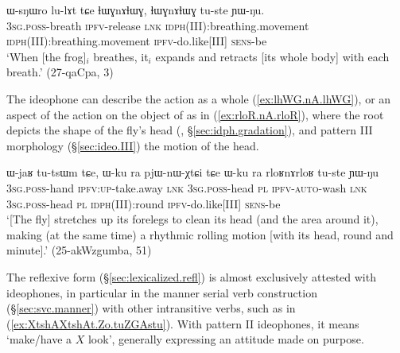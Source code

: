 \begin{exe}
\ex \label{ex:lhWG.nA.lhWG}
\gll ɯ-sŋɯro lu-lɤt tɕe ɬɯɣnɤɬɯɣ, ɬɯɣnɤɬɯɣ tu-ste ɲɯ-ŋu.\\
\textsc{3sg}.\textsc{poss}-breath \textsc{ipfv}-release \textsc{lnk} \textsc{idph}(III):breathing.movement \textsc{idph}(III):breathing.movement \textsc{ipfv}-do.like[III] \textsc{sens}-be \\
\glt `When [the frog]$_i$ breathes, it$_i$ expands and retracts [its whole body] with each breath.' (27-qaCpa, 3)
\end{exe}

The ideophone can describe the action as a whole (\ref{ex:lhWG.nA.lhWG}), or an aspect of the action on the object of  as in (\ref{ex:rloR.nA.rloR}), where the root    depicts the shape of the fly's head (, §\ref{sec:idph.gradation}), and pattern III morphology (§\ref{sec:ideo.III}) the motion of the head.

\begin{exe}
\ex \label{ex:rloR.nA.rloR}
\gll ɯ-jaʁ tu-tsɯm tɕe, ɯ-ku ra pjɯ-nɯ-χtɕi tɕe ɯ-ku ra rloʁnɤrloʁ tu-ste ɲɯ-ŋu \\
\textsc{3sg}.\textsc{poss}-hand \textsc{ipfv}:\textsc{up}-take.away \textsc{lnk} \textsc{3sg}.\textsc{poss}-head \textsc{pl} \textsc{ipfv}-\textsc{auto}-wash \textsc{lnk} \textsc{3sg}.\textsc{poss}-head \textsc{pl}  \textsc{idph}(III):round  \textsc{ipfv}-do.like[III] \textsc{sens}-be \\ 
\glt `[The fly] stretches up its forelegs to clean its head (and the area around it), making (at the same time) a rhythmic rolling motion [with its head, round and minute].' (25-akWzgumba, 51)
\end{exe}

The reflexive form  (§\ref{sec:lexicalized.refl}) is almost exclusively attested with ideophones, in particular in the manner serial verb construction (§\ref{sec:svc.manner}) with other intransitive verbs, such as  in (\ref{ex:XtshAXtshAt.Zo.tuZGAstu}). With pattern II ideophones, it means `make/have a $X$ look', generally expressing an attitude made on purpose.

